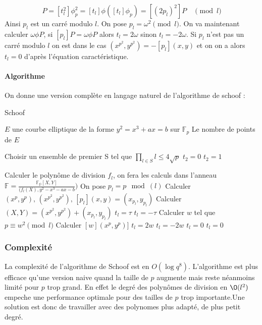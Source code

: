 \documentclass{article}
\begin{document}
\begin{equation}
[t_l^2 p_l]P = [t_l^2] \phi_p^2 = [t_l] \phi ([t_l] \phi_p) = [(2p_l)^2]P \quad \pmod{l}
\end{equation}
Ainsi $p_l$ est un carré modulo $l$. On pose $p_l = \omega^2 \pmod{l}$. On va maintenant calculer $\omega \phi P$, si $[p_l]P = \omega \phi P$ alors $t_l = 2\omega$ sinon $t_l = -2\omega$.
\newline
\medskip
Si $p_l$ n'est pas un carré modulo $l$ on est dans le cas $(x^{p^2}, y^{p^2}) = - [p_l](x,y)$ et on on a alors $t_l = 0$ d'après l'équation caractéristique. 



\newpage
\paragraph{Algorithme}
On donne une version complète en langage naturel de l'algorithme de schoof : 

\begin{algorithm}
\caption{Schoof}
\begin{algorithmic}
\REQUIRE $E$ une courbe elliptique de la forme $y^2 = x^3 + ax = b$ sur $\mathbb{F}_p$
\ENSURE Le nombre de points de $E$

\STATE Choisir un ensemble de premier S tel que $\prod_{l \in S}l \leq 4\sqrt{p}$
\STATE $t_2 = 0$
\ELSE
\STATE $t_2 = 1$
\ENDIF

\STATE Calculer le polynôme de division $f_l$, on fera les calculs dans l'anneau $\mathbb{F}= \frac{\mathbb{F_p}[X,Y]}{(f_l(X), y^2 -x^3 - ax - b})$
\STATE On pose $p_l = p \mod(l)$
\STATE Calculer $(x^p, y^p), \, (x^{p^2}, y^{p^2}), \, [p_l](x, y) = (x_{p_l}, y_{p_l})$
\STATE Calculer $(X, Y) = (x^{p^2}, y^{p^2}) + (x_{p_l}, y_{p_l})$
\STATE $t_l = \tau$
\ELSE 
\STATE $t_l = - \tau$
\ENDIF
\ENDIF
\ENDFOR
\ELSE
{}
\STATE Calculer $w$ tel que $p \equiv w^2 \pmod l$ 
\STATE Calculer $[w](x^p,y^p)]$
\IF{$[w](x^p,y^p)] = (x^{p^2}, y^{p^2})$}
\STATE $t_l = 2w$
\ENDIF
\IF{$[w](x^p,y^p)] = (x^{p^2}, -y^{p^2})$}
\STATE $t_l = -2w$
\ELSE
\STATE $t_l =0$
\ENDIF
\ELSE
\STATE $t_l = 0$

\ENDIF
\ENDIF
\ENDFOR
\end{algorithmic}
\end{algorithm}




\subsubsection{Complexité}
La complexité de l'algorithme de Schoof est en $O(\log{q}^8)$. L'algorithme est plus efficace qu'une version naive quand la taille de $p$ augmente mais reste néanmoins limité pour $p$ trop grand. En effet le degré des polynômes de division en $\O(l^2)$ empeche une performance optimale pour des tailles de $p$ trop importante.Une solution est donc de travailler avec des polynomes plus adapté, de plus petit degré. 
\end{document}
